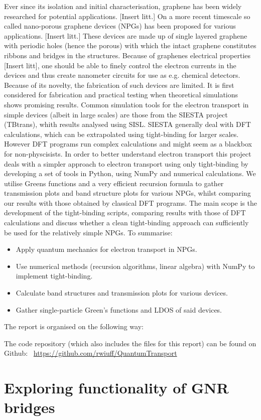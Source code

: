 Ever since its isolation and initial characterisation, graphene has been widely researched for potential applications. [Insert litt.] On a more recent timescale so called nano-porous graphene devices (NPGs) has been proposed for various applications. [Insert litt.] These devices are made up of single layered graphene with periodic holes (hence the porous) with which the intact graphene constitutes ribbons and bridges in the structures. Because of graphenes electrical properties [Insert litt], one should be able to finely control the electron currents in the devices and thus create nanometer circuits for use as e.g. chemical detectors. Because of its novelty, the fabrication of such devices are limited. It is first considered for fabrication and practical testing when theoretical simulations shows promising results. Common simulation tools for the electron transport in simple devices (albeit in large scales) are those from the SIESTA project (TBtrans), whith results analysed using SISL\cite{zerothi_sisl}. SIESTA generally deal with DFT calculations, which can be extrapolated using tight-binding for larger scales\cite{calogero_electron_2019}. However DFT programs run complex calculations and might seem as a blackbox for non-physcisists. In order to better understand electron transport this project deals with a simpler approach to electron transport using only tight-binding by developing a set of tools in Python, using NumPy and numerical calculations. We utilise Greens functions and a very efficient recursion formula to gather transmission plots and band structure plots for various NPGs, whilst comparing our results with those obtained by classical DFT programs. The main scope is the development of the tight-binding scripts, comparing results with those of DFT calculations and discuss whether a clean tight-binding approach can sufficiently be used for the relatively simple NPGs.
To summarise:
\begin{itemize}
    \item Apply quantum mechanics for electron transport in NPGs.
    \item Use numerical methods (recursion algorithms, linear algebra) with NumPy to implement tight-binding.
    \item Calculate band structures and transmission plots for various devices.
    \item Gather single-particle Green’s functions and LDOS of said devices.
\end{itemize}
The report is organised on the following way:
The code repository (which also includes the \latex files for this report) can be found on Github: \faGithub \ \url{https://github.com/rwiuff/QuantumTransport}



\section{Exploring functionality of GNR bridges}\label{testsec}